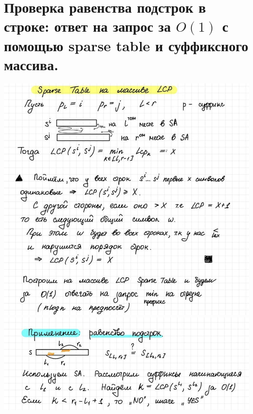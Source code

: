 \section{Проверка равенства подстрок в строке: ответ на запрос за $O(1)$ с помощью sparse table и суффиксного массива.}

\includegraphics[width=1\linewidth]{images/Sparse_task1.jpg}
\newline \includegraphics[width=1\linewidth]{images/Sparse_task2.jpg}
\newpage

